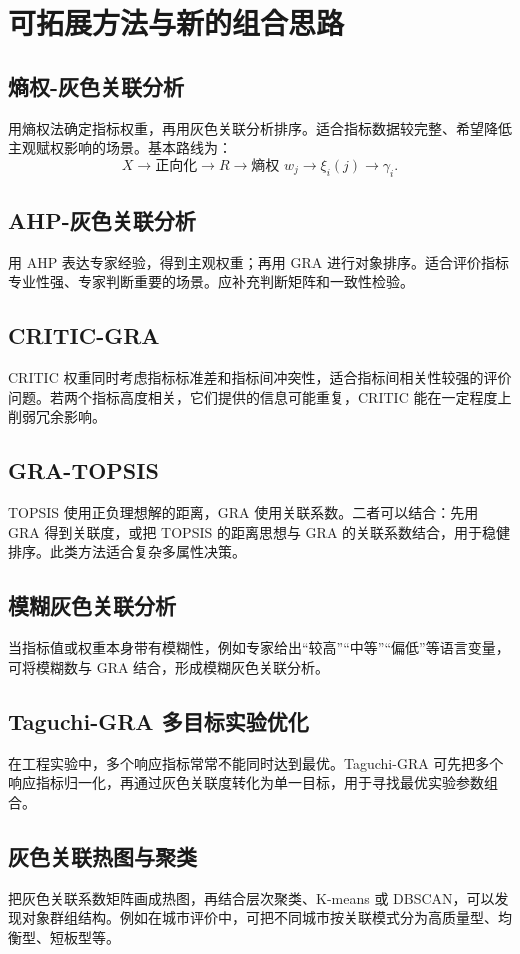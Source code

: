 \documentclass[UTF8,a4paper,11pt]{ctexart}
\begin{document}
\section{可拓展方法与新的组合思路}
\subsection{熵权-灰色关联分析}
用熵权法确定指标权重，再用灰色关联分析排序。适合指标数据较完整、希望降低主观赋权影响的场景。基本路线为：
\[
X\rightarrow \text{正向化}\rightarrow R\rightarrow \text{熵权 }w_j\rightarrow \xi_i(j)\rightarrow \gamma_i.
\]

\subsection{AHP-灰色关联分析}
用 AHP 表达专家经验，得到主观权重；再用 GRA 进行对象排序。适合评价指标专业性强、专家判断重要的场景。应补充判断矩阵和一致性检验。

\subsection{CRITIC-GRA}
CRITIC 权重同时考虑指标标准差和指标间冲突性，适合指标间相关性较强的评价问题。若两个指标高度相关，它们提供的信息可能重复，CRITIC 能在一定程度上削弱冗余影响。

\subsection{GRA-TOPSIS}
TOPSIS 使用正负理想解的距离，GRA 使用关联系数。二者可以结合：先用 GRA 得到关联度，或把 TOPSIS 的距离思想与 GRA 的关联系数结合，用于稳健排序。此类方法适合复杂多属性决策。

\subsection{模糊灰色关联分析}
当指标值或权重本身带有模糊性，例如专家给出“较高”“中等”“偏低”等语言变量，可将模糊数与 GRA 结合，形成模糊灰色关联分析。

\subsection{Taguchi-GRA 多目标实验优化}
在工程实验中，多个响应指标常常不能同时达到最优。Taguchi-GRA 可先把多个响应指标归一化，再通过灰色关联度转化为单一目标，用于寻找最优实验参数组合。

\subsection{灰色关联热图与聚类}
把灰色关联系数矩阵画成热图，再结合层次聚类、K-means 或 DBSCAN，可以发现对象群组结构。例如在城市评价中，可把不同城市按关联模式分为高质量型、均衡型、短板型等。
\end{document}
